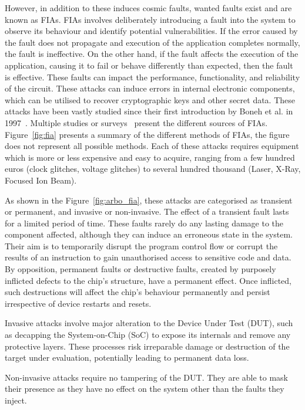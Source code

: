 However, in addition to these induces cosmic faults, wanted faults exist and are known as FIAs. FIAs involves deliberately introducing a fault into the system to observe its behaviour and identify potential vulnerabilities. If the error caused by the fault does not propagate and execution of the application completes normally, the fault is ineffective. On the other hand, if the fault affects the execution of the application, causing it to fail or behave differently than expected, then the fault is effective. These faults can impact the performance, functionality, and reliability of the circuit. These attacks can induce errors in internal electronic components, which can be utilised to recover cryptographic keys and other secret data.
These attacks have been vastly studied since their first introduction by Boneh et al. in 1997~\cite{BDL-97-eurocrypt,BDL-01-crypto}. Multiple studies or surveys~\cite{ZAV-06-jarab, BCNTW-06-procieee, CKNDCTD-21-compsec, PBR-15-dtis, YSW-18-hss, BH-22-access} present the different sources of FIAs.
Figure~\ref{fig:fia} presents a summary of the different methods of FIAs, the figure does not represent all possible methods. Each of these attacks requires equipment which is more or less expensive and easy to acquire, ranging from a few hundred euros (clock glitches, voltage glitches) to several hundred thousand (Laser, X-Ray, Focused Ion Beam).

As shown in the Figure~\ref{fig:arbo_fia}, these attacks are categorised as transient or permanent, and invasive or non-invasive.
The effect of a transient fault lasts for a limited period of time. These faults rarely do any lasting damage to the component affected, although they can induce an erroneous state in the system. Their aim is to temporarily disrupt the program control flow or corrupt the results of an instruction to gain unauthorised access to sensitive code and data.
By opposition, permanent faults or destructive faults, created by purposely inflicted defects to the chip’s structure, have a permanent effect. Once inflicted, such destructions will affect the chip’s behaviour permanently and persist irrespective of device restarts and resets.

Invasive attacks involve major alteration to the Device Under Test (DUT), such as decapping the System-on-Chip (SoC) to expose its internals and remove any protective layers. These processes risk irreparable damage or destruction of the target under evaluation, potentially leading to permanent data loss.

Non-invasive attacks require no tampering of the DUT. They are able to mask their presence as they have no effect on the system other than the faults they inject.

